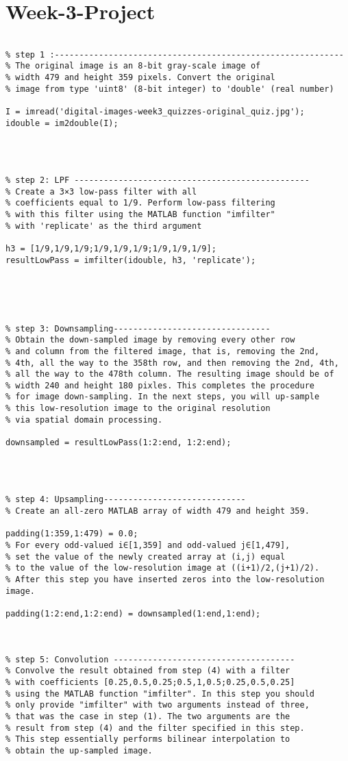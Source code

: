 \documentclass[12 pt]{article}
\begin{document}
 \section{Week-3-Project}
 \begin{lstlisting}
 
% step 1 :-----------------------------------------------------------
% The original image is an 8-bit gray-scale image of
% width 479 and height 359 pixels. Convert the original
% image from type 'uint8' (8-bit integer) to 'double' (real number)

I = imread('digital-images-week3_quizzes-original_quiz.jpg');
idouble = im2double(I);




% step 2: LPF ------------------------------------------------
% Create a 3×3 low-pass filter with all 
% coefficients equal to 1/9. Perform low-pass filtering
% with this filter using the MATLAB function "imfilter" 
% with 'replicate' as the third argument

h3 = [1/9,1/9,1/9;1/9,1/9,1/9;1/9,1/9,1/9];
resultLowPass = imfilter(idouble, h3, 'replicate');





% step 3: Downsampling--------------------------------
% Obtain the down-sampled image by removing every other row 
% and column from the filtered image, that is, removing the 2nd,
% 4th, all the way to the 358th row, and then removing the 2nd, 4th, 
% all the way to the 478th column. The resulting image should be of 
% width 240 and height 180 pixles. This completes the procedure 
% for image down-sampling. In the next steps, you will up-sample
% this low-resolution image to the original resolution
% via spatial domain processing.

downsampled = resultLowPass(1:2:end, 1:2:end);




% step 4: Upsampling-----------------------------
% Create an all-zero MATLAB array of width 479 and height 359.

padding(1:359,1:479) = 0.0;
% For every odd-valued i∈[1,359] and odd-valued j∈[1,479], 
% set the value of the newly created array at (i,j) equal 
% to the value of the low-resolution image at ((i+1)/2,(j+1)/2).
% After this step you have inserted zeros into the low-resolution image.

padding(1:2:end,1:2:end) = downsampled(1:end,1:end);



% step 5: Convolution -------------------------------------
% Convolve the result obtained from step (4) with a filter 
% with coefficients [0.25,0.5,0.25;0.5,1,0.5;0.25,0.5,0.25] 
% using the MATLAB function "imfilter". In this step you should
% only provide "imfilter" with two arguments instead of three,
% that was the case in step (1). The two arguments are the 
% result from step (4) and the filter specified in this step.
% This step essentially performs bilinear interpolation to 
% obtain the up-sampled image.


\end{lstlisting}
\end{document}
